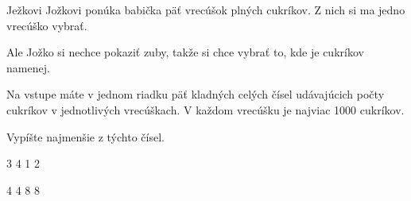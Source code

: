 




Ježkovi Jožkovi ponúka babička päť vrecúšok plných cukríkov. Z nich si ma jedno vrecúško vybrať.

Ale Jožko si nechce pokaziť zuby, takže si chce vybrať to, kde je cukríkov namenej.


Na vstupe máte v jednom riadku päť kladných celých čísel 
udávajúcich počty cukríkov v jednotlivých vrecúškach.
V každom vrecúšku je najviac 1000 cukríkov.

Vypíšte najmenšie z týchto čísel.


 3 4 1 2
\koniec

 4 4 8 8 
\koniec


